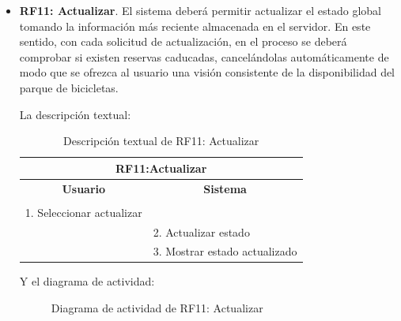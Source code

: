\begin{itemize}
	\item \textbf{RF11: Actualizar}. El sistema deberá permitir actualizar el estado global tomando la información más reciente almacenada en el servidor. En este sentido, con cada solicitud de actualización, en el proceso se deberá comprobar si existen reservas caducadas, cancelándolas automáticamente de modo que se ofrezca al usuario una visión consistente de la disponibilidad del parque de bicicletas.
	
	La descripción textual:
	\begin{table}[h]
		\centering	
		\begin{tabular}{|l|l|}
			\hline
			\multicolumn{2}{|c|}{\textbf{RF11:Actualizar}} \\ \hline
			\multicolumn{1}{|c|}{\textbf{Usuario}} & \multicolumn{1}{c|}{\textbf{Sistema}} \\ \hline
			[Pto. inclusión: RF02: Loguear usuario] &\\ \hline
			1. Seleccionar actualizar &\\ \hline
			& 2. Actualizar estado\\ \hline
			& 3. Mostrar estado actualizado \\ \hline 	
		\end{tabular}
		\caption{Descripción textual de RF11: Actualizar}
		\label{tab:tablaDescTextualRF11}
	\end{table}
	
	Y el diagrama de actividad:
	\begin{figure}[!htb]
		\centering
		\caption{Diagrama de actividad de RF11: Actualizar}
		\label{fig:diagramaActividad_RF11}
	\end{figure}

\end{itemize}

